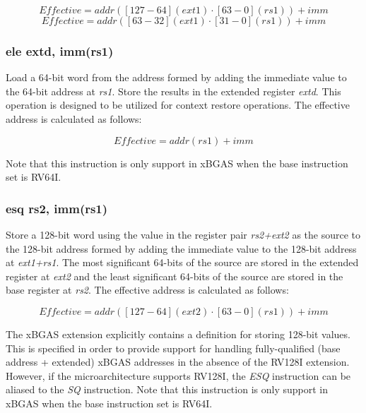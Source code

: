 \documentclass{article}
\begin{document}
\begin{equation}
Effective = addr([127-64](ext1) \cdot [63-0](rs1))+imm
\end{equation}
\begin{equation}
Effective = addr([63-32](ext1) \cdot [31-0](rs1))+imm
\end{equation}

\subsubsection{ele extd, imm(rs1)}
Load a 64-bit word from the address formed by adding the immediate value to the 
64-bit address at \textit{rs1}.  Store the results in the extended register \textit{extd}.  
This operation is designed to be utilized for context restore operations.  The effective 
address is calculated as follows: 

\begin{equation}
Effective = addr(rs1)+imm
\end{equation}

\begin{commentary}
Note that this instruction is only support in xBGAS when the base 
instruction set is RV64I.
\end{commentary}

\subsubsection{esq rs2, imm(rs1)}
Store a 128-bit word using the value in the register pair \textit{rs2+ext2} 
as the source to the 128-bit address formed by adding the immediate value to 
the 128-bit address at \textit{ext1+rs1}.  The most significant 64-bits of the source 
are stored in the extended register at \textit{ext2} and the least significant 64-bits of the source 
are stored in the base register at \textit{rs2}.  The effective address is calculated 
as follows:  

\begin{equation}
Effective = addr([127-64](ext2) \cdot [63-0](rs1))+imm
\end{equation}

\begin{commentary}
The xBGAS extension explicitly contains a definition for storing 128-bit values.  
This is specified in order to provide support for handling fully-qualified (base 
address + extended) xBGAS addresses in the absence of the RV128I extension.  However, 
if the microarchitecture supports RV128I, the \textit{ESQ} instruction can be aliased 
to the \textit{SQ} instruction.  Note that this instruction is only support in xBGAS when the base 
instruction set is RV64I.
\end{commentary}
\end{document}
